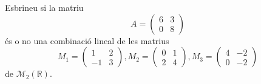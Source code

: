 \begin{exercici}
Esbrineu si la matriu%
\begin{equation*}
A=\left(
\begin{array}{cc}
6 & 3 \\
0 & 8%
\end{array}%
\right)
\end{equation*}%
és o no una combinació lineal de les matrius%
\begin{equation*}
M_{1}=\left(
\begin{array}{cc}
1 & 2 \\
-1 & 3%
\end{array}%
\right) ,M_{2}=\left(
\begin{array}{cc}
0 & 1 \\
2 & 4%
\end{array}%
\right) ,M_{3}=\left(
\begin{array}{cc}
4 & -2 \\
0 & -2%
\end{array}%
\right)
\end{equation*}%
de $\mathcal{M}_{2}(\mathbb{R})$.

\end{exercici}

